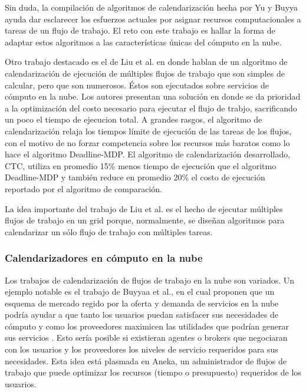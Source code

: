 \documentclass[letterpaper, 12pt]{report}
\begin{document}
Sin duda, la compilación de algoritmos de calendarización hecha por Yu y Buyya ayuda dar esclarecer los esfuerzos actuales por asignar recursos computacionales a tareas de un flujo de trabajo. El reto con este trabajo es hallar la forma de adaptar estos algoritmos a las características únicas del cómputo en la nube.

Otro trabajo destacado es el de Liu et al. \cite{liu2010compromised} en donde hablan de un algoritmo de calendarización de ejecución de múltiples flujos de trabajo que son simples de calcular, pero que son numerosos. Éstos son ejecutados sobre servicios de cómputo en la nube. Los autores presentan una solución en donde se da prioridad a la optimización del costo necesario para ejecutar el flujo de trabjo, sacrificando un poco el tiempo de ejecucion total. A grandes rasgos, el algoritmo de calendarización relaja los tiempos límite de ejecución de las tareas de los flujos, con el motivo de no forzar competencia sobre los recursos más baratos como lo hace el algoritmo Deadline-MDP. El algoritmo de calendarización desarrollado, CTC, utiliza en promedio 15\% menos tiempo de ejecución que el algoritmo Deadline-MDP y también reduce en promedio 20\% el costo de ejecución reportado por el algoritmo de comparación.

La idea importante del trabajo de Liu et al. es el hecho de ejecutar múltiples flujos de trabajo en un grid porque, normalmente, se diseñan algoritmos para calendarizar un sólo flujo de trabajo con múltiples tareas. %


\subsubsection*{Calendarizadores en cómputo en la nube}

Los trabajos de calendarización de flujos de trabajo en la nube son variados. Un ejemplo notable es el trabajo de Buyyaa et al., en el cual proponen que un esquema de mercado regido por la oferta y demanda de servicios en la nube podría ayudar a que tanto los usuarios puedan satisfacer sus necesidades de cómputo y como los proveedores maximicen las utilidades que podrían generar sus servicios \cite{buyya2009cloud}. Esto sería posible si existieran agentes o brokers que negociaran con los usuarios y los proveedores los niveles de servicio requeridos para sus necesidades. Esta idea está plasmada en Aneka, un administrador de flujos de trabajo que puede optimizar los recursos (tiempo o presupuesto) requeridos de los usuarios.
\end{document}
